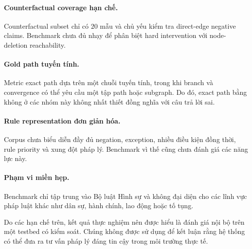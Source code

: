 \paragraph{Counterfactual coverage hạn chế.}

Counterfactual subset chỉ có \(20\) mẫu và chủ yếu kiểm tra direct-edge
negative claims. Benchmark chưa đủ nhạy để phân biệt hard intervention với
node-deletion reachability.

\paragraph{Gold path tuyến tính.}

Metric exact path dựa trên một chuỗi tuyến tính, trong khi branch và
convergence có thể yêu cầu một tập path hoặc subgraph. Do đó, exact path
bằng không ở các nhóm này không nhất thiết đồng nghĩa với câu trả lời sai.

\paragraph{Rule representation đơn giản hóa.}

Corpus chưa biểu diễn đầy đủ negation, exception, nhiều điều kiện đồng thời,
rule priority và xung đột pháp lý. Benchmark vì thế cũng chưa đánh giá các
năng lực này.

\paragraph{Phạm vi miền hẹp.}

Benchmark chỉ tập trung vào Bộ luật Hình sự và không đại diện cho các lĩnh
vực pháp luật khác như dân sự, hành chính, lao động hoặc tố tụng.

Do các hạn chế trên, kết quả thực nghiệm nên được hiểu là đánh giá nội bộ
trên một testbed có kiểm soát. Chúng không được sử dụng để kết luận rằng hệ
thống có thể đưa ra tư vấn pháp lý đáng tin cậy trong môi trường thực tế.
